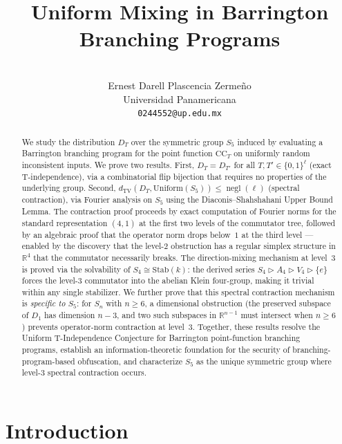 \documentclass[11pt]{article}
\title{Uniform Mixing in Barrington Branching Programs}
\author{\vspace{3cm}\\Ernest Darell Plascencia Zerme\~no\\
\small Universidad Panamericana\\
\small \texttt{0244552@up.edu.mx}}
\date{}
\DeclareMathOperator{\negl}{negl}
\newcommand{\dtv}{d_{\mathrm{TV}}}
\newcommand{\CC}{\mathrm{CC}}
\begin{document}
\maketitle

\vspace{2cm}
\begin{abstract}
We study the distribution $D_T$ over the symmetric group $S_5$ induced by evaluating
a Barrington branching program for the point function $\CC_T$ on uniformly random
inconsistent inputs. We prove two results. First, $D_T = D_{T'}$ for all
$T, T' \in \{0,1\}^\ell$ (exact T-independence), via a combinatorial flip bijection
that requires no properties of the underlying group. Second,
$\dtv(D_T, \mathrm{Uniform}(S_5)) \leq \negl(\ell)$ (spectral contraction),
via Fourier analysis on $S_5$ using the Diaconis--Shahshahani Upper Bound Lemma.
The contraction proof proceeds by exact computation of Fourier norms for the standard
representation $(4,1)$ at the first two levels of the commutator tree, followed by
an algebraic proof that the operator norm drops below~$1$ at the third level
--- enabled by the discovery that the level-$2$ obstruction has a regular simplex
structure in $\mathbb{R}^4$ that the commutator necessarily breaks.
The direction-mixing mechanism at level~$3$ is proved via the solvability of
$S_4 \cong \mathrm{Stab}(k)$: the derived series
$S_4 \rhd A_4 \rhd V_4 \rhd \{e\}$ forces the level-$3$ commutator
into the abelian Klein four-group, making it trivial within any single
stabilizer. We further prove that this spectral contraction mechanism is
\emph{specific to $S_5$}: for $S_n$ with $n \geq 6$, a dimensional
obstruction (the preserved subspace of $D_1$ has dimension $n-3$, and
two such subspaces in $\mathbb{R}^{n-1}$ must intersect when $n \geq 6$)
prevents operator-norm contraction at level~$3$. Together,
these results resolve the Uniform T-Independence Conjecture for Barrington
point-function branching programs, establish an information-theoretic foundation
for the security of branching-program-based obfuscation, and characterize
$S_5$ as the unique symmetric group where level-$3$ spectral contraction occurs.
\end{abstract}

\newpage
\tableofcontents
\newpage

\section{Introduction}
\label{sec:intro}
\end{document}
